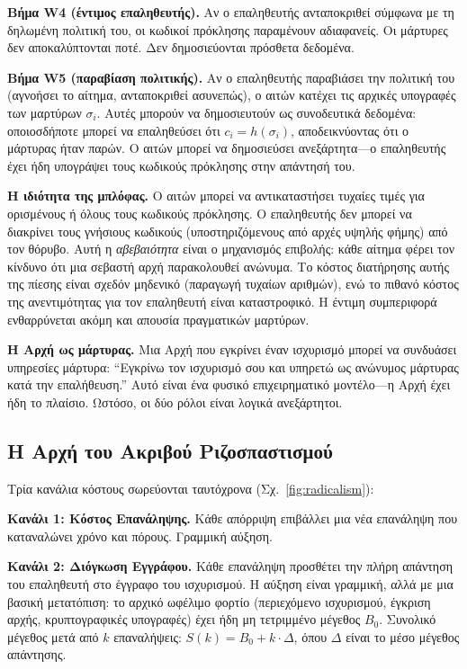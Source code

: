 \documentclass[11pt,a4paper,twocolumn]{article}
\begin{document}
\textbf{Βήμα W4 (έντιμος επαληθευτής).} Αν ο επαληθευτής ανταποκριθεί σύμφωνα με τη δηλωμένη πολιτική του, οι κωδικοί πρόκλησης παραμένουν αδιαφανείς. Οι μάρτυρες δεν αποκαλύπτονται ποτέ. Δεν δημοσιεύονται πρόσθετα δεδομένα.

\textbf{Βήμα W5 (παραβίαση πολιτικής).} Αν ο επαληθευτής παραβιάσει την πολιτική του (αγνοήσει το αίτημα, ανταποκριθεί ασυνεπώς), ο αιτών κατέχει τις αρχικές υπογραφές των μαρτύρων $\sigma_i$. Αυτές μπορούν να δημοσιευτούν ως συνοδευτικά δεδομένα: οποιοσδήποτε μπορεί να επαληθεύσει ότι $c_i = h(\sigma_i)$, αποδεικνύοντας ότι ο μάρτυρας ήταν παρών. Ο αιτών μπορεί να δημοσιεύσει ανεξάρτητα---ο επαληθευτής έχει ήδη υπογράψει τους κωδικούς πρόκλησης στην απάντησή του.

\textbf{Η ιδιότητα της μπλόφας.} Ο αιτών μπορεί να αντικαταστήσει τυχαίες τιμές για ορισμένους ή όλους τους κωδικούς πρόκλησης. Ο επαληθευτής δεν μπορεί να διακρίνει τους γνήσιους κωδικούς (υποστηριζόμενους από αρχές υψηλής φήμης) από τον θόρυβο. Αυτή η \emph{αβεβαιότητα} είναι ο μηχανισμός επιβολής: κάθε αίτημα φέρει τον κίνδυνο ότι μια σεβαστή αρχή παρακολουθεί ανώνυμα. Το κόστος διατήρησης αυτής της πίεσης είναι σχεδόν μηδενικό (παραγωγή τυχαίων αριθμών), ενώ το πιθανό κόστος της ανεντιμότητας για τον επαληθευτή είναι καταστροφικό. Η έντιμη συμπεριφορά ενθαρρύνεται ακόμη και απουσία πραγματικών μαρτύρων.

\textbf{Η Αρχή ως μάρτυρας.} Μια Αρχή που εγκρίνει έναν ισχυρισμό μπορεί να συνδυάσει υπηρεσίες μάρτυρα: ``Εγκρίνω τον ισχυρισμό σου και υπηρετώ ως ανώνυμος μάρτυρας κατά την επαλήθευση.'' Αυτό είναι ένα φυσικό επιχειρηματικό μοντέλο---η Αρχή έχει ήδη το πλαίσιο. Ωστόσο, οι δύο ρόλοι είναι λογικά ανεξάρτητοι.

\subsection{Η Αρχή του Ακριβού Ριζοσπαστισμού}

Τρία κανάλια κόστους σωρεύονται ταυτόχρονα (Σχ.~\ref{fig:radicalism}):

\textbf{Κανάλι 1: Κόστος Επανάληψης.} Κάθε απόρριψη επιβάλλει μια νέα επανάληψη που καταναλώνει χρόνο και πόρους. Γραμμική αύξηση.

\textbf{Κανάλι 2: Διόγκωση Εγγράφου.} Κάθε επανάληψη προσθέτει την πλήρη απάντηση του επαληθευτή στο έγγραφο του ισχυρισμού. Η αύξηση είναι γραμμική, αλλά με μια βασική μετατόπιση: το αρχικό ωφέλιμο φορτίο (περιεχόμενο ισχυρισμού, έγκριση αρχής, κρυπτογραφικές υπογραφές) έχει ήδη μη τετριμμένο μέγεθος $B_0$. Συνολικό μέγεθος μετά από $k$ επαναλήψεις: $S(k) = B_0 + k \cdot \Delta$, όπου $\Delta$ είναι το μέσο μέγεθος απάντησης.
\end{document}
